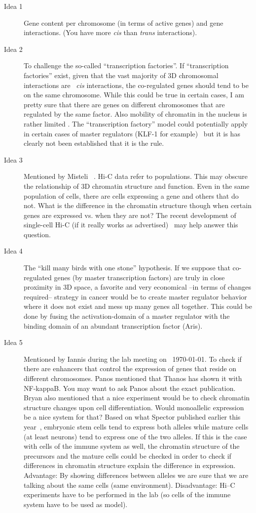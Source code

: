 \documentclass[a4paper,12pt]{article}
\begin{document}
\begin{description}
	\item [Idea 1] Gene content per chromosome (in terms of active genes) and gene interactions. (You have more \emph{cis} than \emph{trans} interactions).
	\item [Idea 2] To challenge the so-called ``transcription factories''. If ``transcription
	factories'' exist, given that the vast majority of 3D chromosomal interactions are ~\emph{cis} interactions, the co-regulated genes should tend to be on the same chromosome. While this could be true in certain cases, I am pretty sure
	that there are genes on different chromosomes that are regulated by the same factor. Also mobility of chromatin in the nucleus is rather limited \cite{Soutoglou:2007gl,Kumaran:2008jd}. The ``transcription factory'' model could potentially apply in certain cases of master regulators (KLF-1 for example)~\cite{Schoenfelder:2010ij} but it is has clearly not been established that it is the rule. 
	\item [Idea 3] Mentioned by Misteli ~\cite{Misteli:2012ea}. Hi-C data refer to populations. This may obscure the relationship of 3D chromatin structure and function. Even in the same population of cells, there are cells expressing a gene and others that do not. What is the difference in the chromatin structure though when certain genes are expressed vs. when they are not? The recent development of single-cell Hi-C (if it really works as advertised)~\cite{Nagano:2013gja} may help answer this question. 
	\item [Idea 4] The ``kill many birds with one stone'' hypothesis. If we suppose that co-regulated genes (by master transcription factors) are truly in close proximity in 3D space, a favorite and very economical --in terms of changes required-- strategy in cancer would be to create master regulator behavior where it does not exist and mess up many genes all together. This could be done by fusing the activation-domain of a master regulator with the binding domain of an abundant transcription factor (Aris).
	\item [Idea 5] Mentioned by Iannis during the lab meeting on ~\today. To check if there are enhancers that control the expression of genes that reside on different chromosomes. Panos mentioned that Thanos has shown it with NF-kappaB.
	You may want to ask Panos about the exact publication. Bryan also mentioned that a nice experiment would be to check chromatin structure changes upon cell differentiation. Would monoallelic expression be a nice system for that? Based on what Spector published earlier this year~\cite{EckersleyMaslin:2014hq}, embryonic stem cells tend to express both alleles while mature cells (at least neurons) tend to express one of the two alleles. If this is the case with cells of the immune system as well, the chromatin structure of the precursors and the mature cells could be checked in order to check if differences in chromatin structure explain the difference in expression. Advantage: Βy showing differences between alleles we are sure that we are talking about the same cells (same environment). Disadvantage: Hi--C experiments have to be performed in the lab (so cells of the immune system have to be used as model). 
\end{description}



\end{document}
